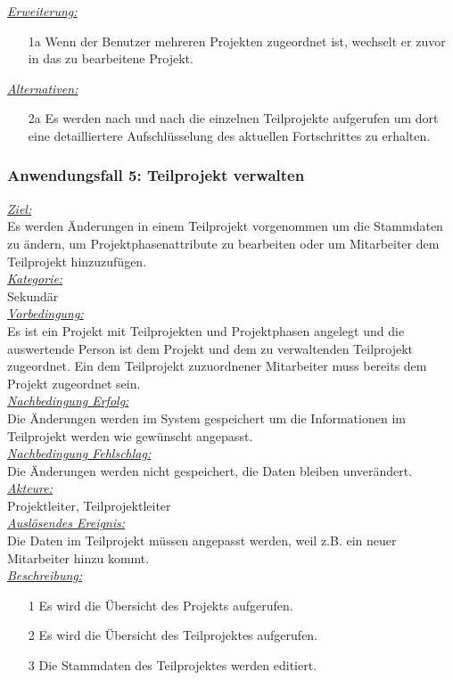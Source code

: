\underline{\emph{Erweiterung:}}
\begin{itemize}
    \item [1a] Wenn der Benutzer mehreren Projekten zugeordnet ist, wechselt er zuvor in das zu bearbeitene Projekt.
\end{itemize}
\underline{\emph{Alternativen:}}
\begin{itemize}
    \item [2a] Es werden nach und nach die einzelnen Teilprojekte aufgerufen um dort eine detailliertere Aufschlüsselung des aktuellen Fortschrittes zu erhalten.
\end{itemize}

\subsubsection{Anwendungsfall 5: Teilprojekt verwalten}
\underline{\emph{Ziel:}}\\
Es werden Änderungen in einem Teilprojekt vorgenommen um die Stammdaten zu ändern, um Projektphasenattribute zu bearbeiten oder um Mitarbeiter dem Teilprojekt hinzuzufügen.\\
\underline{\emph{Kategorie:}} \\
Sekundär\\
\underline{\emph{Vorbedingung:}} \\
Es ist ein Projekt mit Teilprojekten und Projektphasen angelegt und die auswertende Person ist dem Projekt und dem zu verwaltenden Teilprojekt zugeordnet. Ein dem Teilprojekt zuzuordnener Mitarbeiter muss bereits dem Projekt zugeordnet sein.\\
\underline{\emph{Nachbedingung Erfolg:}} \\
Die Änderungen werden im System gespeichert um die Informationen im Teilprojekt werden wie gewünscht angepasst.\\
\underline{\emph{Nachbedingung Fehlschlag:}} \\
Die Änderungen werden nicht gespeichert, die Daten bleiben unverändert.\\
\underline{\emph{Akteure:}} \\
Projektleiter, Teilprojektleiter\\
\underline{\emph{Auslösendes Ereignis:}} \\
Die Daten im Teilprojekt müssen angepasst werden, weil z.B. ein neuer Mitarbeiter hinzu kommt.\\
\underline{\emph{Beschreibung:}} 
\begin{itemize}
    \item [1] Es wird die Übersicht des Projekts aufgerufen.
    \item [2] Es wird die Übersicht des Teilprojektes aufgerufen.
    \item [3] Die Stammdaten des Teilprojektes werden editiert.
\end{itemize}

